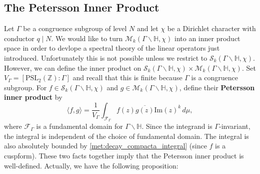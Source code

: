 \documentclass[12pt]{book}
\theoremstyle{definition}\newframedtheorem{method}{Method}
\newcommand{\mc}{\mathcal}
\newcommand{\PSL}{\mathrm{PSL}}
\newcommand{\Z}{\mathbb{Z}}
\renewcommand{\H}{\mathbb{H}}
\newcommand{\G}{\Gamma}
\newcommand{\x}{\times}
\newcommand{\<}{\langle}
\renewcommand{\>}{\rangle}
\newcommand{\conj}{\overline}
\renewcommand{\Im}{\mathrm{Im}}
\newcommand{\GH}{\G\backslash\H}
\begin{document}
    \subsection*{The Petersson Inner Product}
      Let $\G$ be a congruence subgroup of level $N$ and let $\chi$ be a Dirichlet character with conductor $q \mid N$. We would like to turn $\mc{M}_{k}(\GH,\chi)$ into an inner product space in order to devlope a spectral theory of the linear operators just introduced. Unfortunately this is not possible unless we restrict to $\mc{S}_{k}(\GH,\chi)$. However, we can define the inner product on $\mc{S}_{k}(\GH,\chi) \x \mc{M}_{k}(\GH,\chi)$. Set $V_{\G} = [\PSL_{2}(\Z):\G]$ and recall that this is finite because $\G$ is a congruence subgroup. For $f \in \mc{S}_{k}(\GH,\chi)$ and $g \in \mc{M}_{k}(\GH,\chi)$, define their \textbf{Petersson inner product} by
      \[
        \<f,g\> = \frac{1}{V_{\G}}\int_{\mc{F}_{\G}}f(z)\conj{g(z)}\Im(z)^{k}\,d\mu,
      \]
      where $\mc{F}_{\G}$ is a fundamental domain for $\GH$. Since the integrand is $\G$-invariant, the integral is independent of the choice of fundamental domain. The integral is also absolutely bounded by \cref{met:decay_compacta_integral} (since $f$ is a cuspform). These two facts together imply that the Petersson inner product is well-defined. Actually, we have the following proposition:
\end{document}
